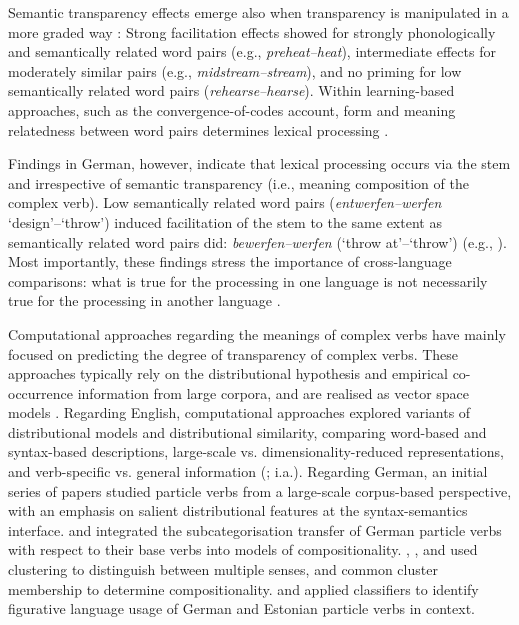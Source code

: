 \documentclass[output=paper]{langsci/langscibook}
\begin{document}
Semantic transparency effects emerge also when transparency is
manipulated in a more graded way \citep{GonnermanEtAl:07}: Strong
facilitation effects showed for strongly phonologically and
semantically related word pairs (e.g., \textit{preheat--heat}),
intermediate effects for moderately similar pairs (e.g.,
\textit{midstream--stream}), and no priming for low semantically
related word pairs (\textit{rehearse--hearse}). Within learning-based
approaches, such as the convergence-of-codes account, form and meaning
relatedness between word pairs determines lexical processing
\citep{Plaut/Gonnerman:00, GonnermanEtAl:07}.

Findings in German, however, indicate that lexical processing occurs via the stem and irrespective of semantic transparency
(i.e., meaning composition of the complex verb). Low semantically
related word pairs (\textit{entwerfen--werfen} `design'--`throw')
induced facilitation of the stem to the same extent as semantically
related word pairs did: \textit{bewerfen--werfen} (`throw at'--`throw')
(e.g., \citealt{SmolkaEtAl:09, SmolkaEtAl:14, SmolkaEtAl:15,
  SmolkaEtAl:18}). Most importantly, these findings stress the
importance of cross-language comparisons: what is true for the
processing in one language is not necessarily true for the processing
in another language \citep{GuentherEtAl:18}.

Computational approaches regarding the meanings of complex verbs have
mainly focused on predicting the degree of transparency of complex
verbs. These approaches typically rely on the distributional
hypothesis \citep{Harris:54,Firth:57} and empirical co-occurrence
information from large corpora, and are realised as vector space
models \citep{Turney/Pantel:10}. Regarding English, computational
approaches explored variants of distributional models and
distributional similarity, comparing word-based and syntax-based
descriptions, large-scale vs. dimensionality-reduced representations,
and verb-specific vs. general information
(\citealt{BaldwinEtAl:03,McCarthyEtAl:03,Bannard:05,Cook/Stevenson:06}; i.a.).
Regarding German, an initial series of papers
\citep{Aldinger:04,SchulteImWalde:04a,SchulteImWalde:05,SchulteImWalde:06c}
studied particle verbs from a large-scale corpus-based perspective,
with an emphasis on salient distributional features at the
syntax-semantics interface. \cite{SchulteImWalde:06c} and
\cite{Bott/SchulteImWalde:18} integrated the subcategorisation
transfer of German particle verbs with respect to their base verbs
into models of
compositionality. \cite{Kuehner/SchulteImWalde:10}, \cite{Bott/SchulteImWalde:17},  and \cite{Koeper/SchulteImWalde:17a}
used clustering to distinguish between multiple senses, and common
cluster membership to determine
compositionality. \cite{Koeper/SchulteImWalde:16b} and
\cite{AedmaaEtAl:18} applied classifiers to identify figurative
language usage of German and Estonian particle verbs in context.
\end{document}
